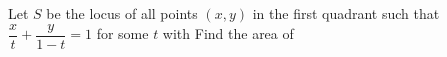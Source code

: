 Let $S$ be the locus of all points $(x,y)$ in the first quadrant such that $\dfrac{x}{t}+\dfrac{y}{1-t}=1$ for some $t$ with   Find the area of 